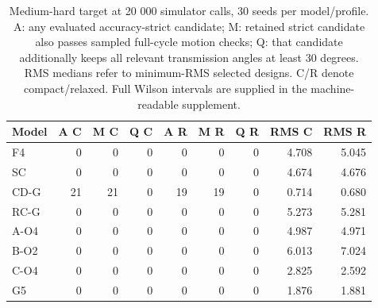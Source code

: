 \begin{table}[H]
\caption{Medium-hard target at 20 000 simulator calls, 30 seeds per model/profile. A: any evaluated accuracy-strict candidate; M: retained strict candidate also passes sampled full-cycle motion checks; Q: that candidate additionally keeps all relevant transmission angles at least 30 degrees. RMS medians refer to minimum-RMS selected designs. C/R denote compact/relaxed. Full Wilson intervals are supplied in the machine-readable supplement.}
\label{tab:v2_mediumhard}
\centering
\small
\begin{tabular}{@{}lrrrrrrrr@{}}
\toprule
Model & A C & M C & Q C & A R & M R & Q R & RMS C & RMS R \\
\midrule
F4 & 0 & 0 & 0 & 0 & 0 & 0 & 4.708 & 5.045 \\
SC & 0 & 0 & 0 & 0 & 0 & 0 & 4.674 & 4.676 \\
CD-G & 21 & 21 & 0 & 19 & 19 & 0 & 0.714 & 0.680 \\
RC-G & 0 & 0 & 0 & 0 & 0 & 0 & 5.273 & 5.281 \\
A-O4 & 0 & 0 & 0 & 0 & 0 & 0 & 4.987 & 4.971 \\
B-O2 & 0 & 0 & 0 & 0 & 0 & 0 & 6.013 & 7.024 \\
C-O4 & 0 & 0 & 0 & 0 & 0 & 0 & 2.825 & 2.592 \\
G5 & 0 & 0 & 0 & 0 & 0 & 0 & 1.876 & 1.881 \\
\bottomrule
\end{tabular}
\end{table}
